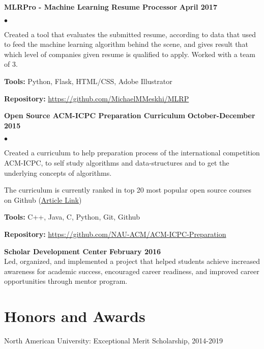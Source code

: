 \documentclass[margin,line]{res}
\newenvironment{list2}{
  \begin{list}{$\bullet$}{%
      \setlength{\itemsep}{0in}
      \setlength{\parsep}{0in} \setlength{\parskip}{0in}
      \setlength{\topsep}{0in} \setlength{\partopsep}{0in} 
      \setlength{\leftmargin}{0.2in}}}{\end{list}}
\begin{document}
\begin{resume}
{\bf MLRPro - Machine Learning Resume Processor} \hfill {\bf April 2017}\\
\vspace{-.3cm}
\begin{list2}
\item Created a tool that evaluates the submitted resume, according to data that used to feed the machine learning algorithm behind the scene, and gives result that which level of companies given resume is qualified to apply. Worked with a team of 3.
\item \textbf{Tools:} Python, Flask, HTML/CSS, Adobe Illustrator
\item \textbf{Repository:} \href{https://github.com/MichaelMMeskhi/MLRP}{https://github.com/MichaelMMeskhi/MLRP}
\end{list2}

{\bf Open Source ACM-ICPC Preparation Curriculum} \hfill {\bf October-December 2015}\\
\vspace{-.3cm}
\begin{list2}
\item Created a curriculum to help preparation process of the international competition ACM-ICPC, to self study algorithms and data-structures and to get the underlying concepts of algorithms.
\item The curriculum is currently ranked in top 20 most popular open source courses on Github (\href{https://education.github.community/t/20-of-the-most-popular-courses-on-github/27832}{Article Link})
\item \textbf{Tools:} C++, Java, C, Python, Git, Github
\item \textbf{Repository:} \href{https://github.com/NAU-ACM/ACM-ICPC-Preparation}{https://github.com/NAU-ACM/ACM-ICPC-Preparation}
\end{list2}

{\bf Scholar Development Center} \hfill {\bf February  2016}\\
Led, organized, and implemented a project that helped students achieve increased awareness for academic success, encouraged
career readiness, and improved career opportunities through mentor program.


\section{\sc Honors and Awards}

North American University: Exceptional Merit Scholarship, 2014-2019


\end{resume}
\end{document}

